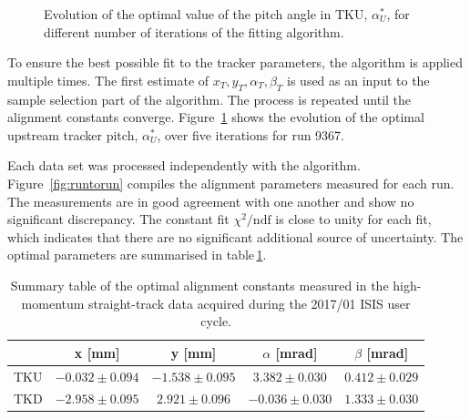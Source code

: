 \begin{figure} [!htb]
\begin{minipage}[b]{.48\textwidth}
		\caption{Evolution of the optimal value of the pitch angle in TKU, $\alpha_U^*$, for different number of iterations of the fitting algorithm.}
		\label{fig:optalpha}
	\end{minipage}
\end{figure}

To ensure the best possible fit to the tracker parameters, the algorithm is applied multiple times. The first estimate of $x_T,y_T,\alpha_T,\beta_T$ is used as an input to the sample selection part of the algorithm. The process is repeated until the alignment constants converge. Figure~\ref{fig:optalpha} shows the evolution of the optimal upstream tracker pitch, $\alpha_U^
*$, over five iterations for run 9367.

Each data set was processed independently with the algorithm. Figure~\ref{fig:runtorun} compiles the alignment parameters measured for each run. The measurements are in good agreement with one another and show no significant discrepancy. The constant fit $\chi^2/\text{ndf}$ is close to unity for each fit, which indicates that there are no significant additional source of uncertainty. The optimal parameters are summarised in table\,\ref{tab:201701_constants}.

\begin{table}[h!]
	\centering
		\begin{tabular}{l|c|c|c|c}
			& x [mm] & y [mm] & $\alpha$ [mrad] & $\beta$ [mrad] \\
			\hline
			TKU & $-0.032\pm0.094$ & $-1.538\pm0.095$ & $3.382\pm0.030$ & $0.412\pm0.029$ \\
			TKD & $-2.958\pm0.095$ & $2.921\pm0.096$ & $-0.036\pm0.030$ & $1.333\pm0.030$
		\end{tabular}
	\caption{Summary table of the optimal alignment constants measured in the high-momentum straight-track data acquired during the 2017/01 ISIS user cycle.}
	\label{tab:201701_constants}
\end{table}

